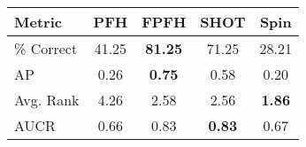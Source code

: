 \begin{tabular}{ | l || c | c | c | c | }
\hline
Metric & PFH & FPFH & SHOT & Spin \\
\hline
 \% Correct & 41.25 & \bf 81.25 & 71.25 & 28.21 \\
AP & 0.26 & \bf 0.75 & 0.58 & 0.20 \\
Avg. Rank & 4.26 & 2.58 & 2.56 & \bf 1.86 \\
AUCR & 0.66 & 0.83 & \bf 0.83 & 0.67 \\
\hline
\end{tabular}